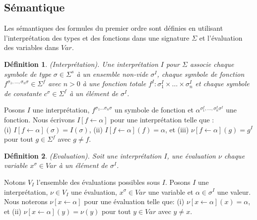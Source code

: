 \documentclass[11pt,openany]{article}
\newtheorem{definition}{D\'efinition}[subsection]
\begin{document}
	\subsection{S\'emantique}
		Les s\'emantiques des formules du premier ordre sont d\'efinies en utilisant l'interpr\'etation des types et des fonctions dans une signature $\Sigma$ et l'\'evaluation des variables dans $Var$.
\begin{definition}
(Interpr\'etation). Une interpr\'etation $I$ pour $\Sigma$ associe chaque symbole de type $\sigma \in \Sigma^{s}$ \`a un ensemble non-vide $\sigma^{I}$, chaque symbole de fonction $f^{\sigma_{1},\ldots,\sigma_{n}\sigma} \in \Sigma^{f}$ avec $n > 0$ \`a une fonction totale $f^{I} : \sigma_{1}^{I}\times \ldots \times \sigma_{n}^{I}$ et chaque symbole de constante $c^{\sigma} \in \Sigma^{f}$ \`a un \'el\'ement de $\sigma^{I}$.
\end{definition}
	Posons $I$ une interpr\'etation, $f^{\sigma_{1} \ldots\sigma_{n} \sigma}$ un symbole de fonction et $\alpha^{\sigma_{1}^{I},\ldots,\sigma_{n}^{I}\sigma^{I}}$ une fonction. Nous \'ecrivons $I[f \leftarrow \alpha]$ pour une interpr\'etation telle que : \\(i) $I[f\leftarrow\alpha](\sigma) = I(\sigma)$, (ii) $I[f\leftarrow\alpha](f) = \alpha$, et (iii) $\nu[f\leftarrow\alpha](g) = g^{I}$ pour tout $g \in \Sigma^{f}$ avec $g\neq f$.
	
\begin{definition}
(Evaluation). Soit une interpr\'etation $I$, une \'evaluation $\nu$ chaque variable $x^{\sigma} \in Var$ \`a un \'el\'ement de $\sigma^{I}$.
\end{definition}
Notons $V_{I}$ l'ensemble des \'evaluations possibles sous $I$.
Posons $I$ une interpr\'etation, $\nu \in V_{I}$ une \'evaluation, $x^{\sigma} \in Var$ une variable et $\alpha \in \sigma^{I}$ une valeur. Nous noterons $\nu[x\leftarrow\alpha]$ pour une \'evaluation telle que: (i) $\nu[x\leftarrow\alpha](x) = \alpha$, et (ii) $\nu[x\leftarrow\alpha](y)=\nu(y)$ pour tout $y\in Var$ avec $y\neq x$.
\end{document}
